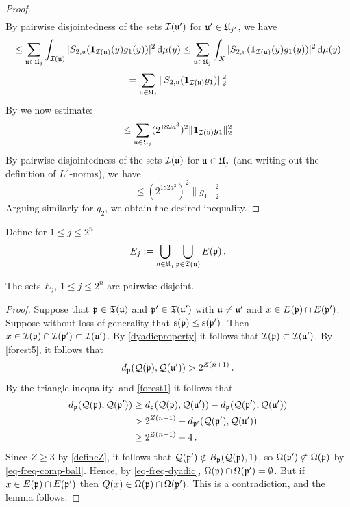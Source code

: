 \begin{proof}
\begin{multline*}
    \end{multline*}
    By pairwise disjointedness of the sets ${\mathcal{I}}({\mathfrak u}')$ for ${\mathfrak u}' \in {\mathfrak U}_{j'}$, we have
    $$
        \le \sum_{{\mathfrak u} \in {\mathfrak U}_j}\int_{{\mathcal{I}}({\mathfrak u})} |S_{2,{\mathfrak u}} (\mathbf{1}_{{\mathcal{I}}({\mathfrak u})}(y)g_1(y))|^2 \, \mathrm{d}\mu(y)
        \le \sum_{{\mathfrak u} \in {\mathfrak U}_j}\int_{X} |S_{2,{\mathfrak u}} (\mathbf{1}_{{\mathcal{I}}({\mathfrak u})}(y)g_1(y))|^2 \, \mathrm{d}\mu(y)
    $$
    $$
       = \sum_{{\mathfrak u} \in {\mathfrak U}_j}\|S_{2,{\mathfrak u}} (\mathbf{1}_{{\mathcal{I}}({\mathfrak u})}g_1)\|_2^2
    $$
    By  we now estimate:
    $$
        \le \sum_{{\mathfrak u} \in {\mathfrak U}_j}(2^{182a^3})^2 \|\mathbf{1}_{{\mathcal{I}}({\mathfrak u})}g_1\|_2^2
    $$
    By pairwise disjointedness of the sets ${\mathcal{I}}({\mathfrak u})$ for ${\mathfrak u} \in {\mathfrak U}_j$ (and writing out the definition of $L^2$-norms), we have
    $$
        \le (2^{182a^3})^2 \|g_1\|_2^2
    $$
    Arguing similarly for $g_2$, we obtain the desired inequality.
\end{proof}

Define for $1 \le j \le 2^n$
$$
    E_j := \bigcup_{{\mathfrak u} \in {\mathfrak U}_j} \bigcup_{{\mathfrak p} \in {\mathfrak T}({\mathfrak u})} E({\mathfrak p})\,.
$$

\begin{lemma}
    \label{disjoint-row-support}
    \leanok
    The sets $E_j$, $1 \le j \le 2^n$ are pairwise disjoint.
\end{lemma}

\begin{proof}
    \leanok
    Suppose that ${\mathfrak p} \in {\mathfrak T}({\mathfrak u})$ and ${\mathfrak p}' \in {\mathfrak T}({\mathfrak u}')$ with ${\mathfrak u} \ne {\mathfrak u}'$ and $x \in E({\mathfrak p}) \cap E({\mathfrak p}')$. Suppose without loss of generality that ${\mathrm{s}}({\mathfrak p}) \le {\mathrm{s}}({\mathfrak p}')$. Then $x \in {\mathcal{I}}({\mathfrak p}) \cap {\mathcal{I}}({\mathfrak p}') \subset {\mathcal{I}}({\mathfrak u}')$. By \eqref{dyadicproperty} it follows that ${\mathcal{I}}({\mathfrak p}) \subset {\mathcal{I}}({\mathfrak u}')$. By \eqref{forest5}, it follows that
    $$
        d_{{\mathfrak p}}({\mathcal{Q}}({\mathfrak p}), {\mathcal{Q}}({\mathfrak u}')) > 2^{Z(n+1)}\,.
    $$
    By the triangle inequality.  and \eqref{forest1} it follows that
    \begin{align*}
        d_{{\mathfrak p}}({\mathcal{Q}}({\mathfrak p}), {\mathcal{Q}}({\mathfrak p}')) &\ge d_{{\mathfrak p}}({\mathcal{Q}}({\mathfrak p}), {\mathcal{Q}}({\mathfrak u}')) - d_{{\mathfrak p}}({\mathcal{Q}}({\mathfrak p}'), {\mathcal{Q}}({\mathfrak u}'))\\
        &> 2^{Z(n+1)} - d_{{\mathfrak p}'}({\mathcal{Q}}({\mathfrak p}'), {\mathcal{Q}}({\mathfrak u}'))\\
        &\ge 2^{Z(n+1)} - 4\,.
    \end{align*}
    Since $Z \ge 3$ by \eqref{defineZ}, it follows that ${\mathcal{Q}}({\mathfrak p}') \notin B_{{\mathfrak p}}({\mathcal{Q}}({\mathfrak p}), 1)$, so $\Omega({\mathfrak p}') \not\subset \Omega({\mathfrak p})$ by \eqref{eq-freq-comp-ball}. Hence, by \eqref{eq-freq-dyadic}, $\Omega({\mathfrak p}) \cap \Omega({\mathfrak p}') = \emptyset$. But if $x \in E({\mathfrak p}) \cap E({\mathfrak p}')$ then $Q(x) \in \Omega({\mathfrak p}) \cap \Omega({\mathfrak p}')$. This is a contradiction, and the lemma follows.
\end{proof}

